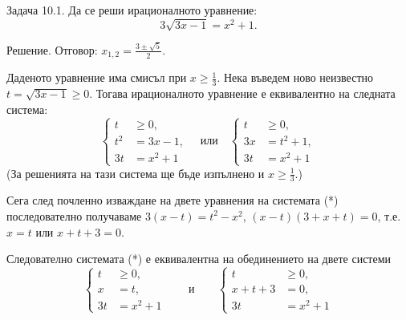 
Задача 10.1. Да се реши ирационалното уравнение:
$$
3 \sqrt{3 x-1}=x^{2}+1 .
$$

Решение. Отговор: $x_{1,2}=\frac{3 \pm \sqrt{5}}{2}$.

Даденото уравнение има смисъл при $x \geq \frac{1}{3}$. Нека въведем ново неизвестно $t=\sqrt{3 x-1} \geq 0$. Тогава ирационалното уравнение е еквивалентно на следната система:
$$
\left\{
\begin{aligned}
t &\geq 0, \\
t^{2} &=3 x-1, \\
3 t &=x^{2}+1
\end{aligned}
\right.
\quad \text{или} \quad
\left\{
\begin{aligned}
t &\geq 0, \\
3 x &=t^{2}+1, \\
3 t &=x^{2}+1
\end{aligned}
\right. \tag{*}
$$
(За решенията на тази система ще бъде изпълнено и $x \geq \frac{1}{3}$.)

Сега след почленно изваждане на двете уравнения на системата (*) последователно получаваме $3(x-t)=t^{2}-x^{2}$, $(x-t)(3+x+t)=0$, т.е. $x=t$ или $x+t+3=0$.

Следователно системата (*) е еквивалентна на обединението на двете системи
$$
\left\{
\begin{aligned}
t &\geq 0, \\
x &=t, \\
3 t &=x^{2}+1
\end{aligned}
\right. \tag{**}
\qquad \text{и} \qquad
\left\{
\begin{aligned}
t &\geq 0, \\
x+t+3 &=0, \\
3 t &=x^{2}+1
\end{aligned}
\right. \tag{***}
$$

